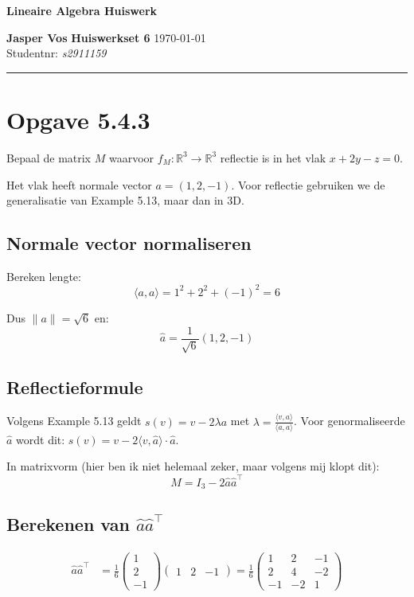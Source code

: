 \documentclass{article}
\newcommand{\R}{\mathbb{R}}
\begin{document}
{\Large \textbf{Lineaire Algebra Huiswerk}}

\bigskip

\textbf{Jasper Vos} \hfill \textbf{Huiswerkset 6} \hfill \today \\
Studentnr: \emph{s2911159}

\rule{\textwidth}{2pt}

\bigskip

\section*{Opgave 5.4.3}

Bepaal de matrix $M$ waarvoor $f_M: \R^3 \to \R^3$ reflectie is in het vlak $x + 2y - z = 0$.

Het vlak heeft normale vector $a = (1, 2, -1)$. Voor reflectie gebruiken we de generalisatie
van Example 5.13, maar dan in 3D.

\subsection*{Normale vector normaliseren}

Bereken lengte:
\[ \langle a, a \rangle = 1^2 + 2^2 + (-1)^2 = 6 \]

Dus $\|a\| = \sqrt{6}$ en:
\[ \hat{a} = \frac{1}{\sqrt{6}}(1, 2, -1) \]

\subsection*{Reflectieformule}

Volgens Example 5.13 geldt $s(v) = v - 2\lambda a$ met $\lambda = \frac{\langle v, a \rangle}{\langle a, a \rangle}$.
Voor genormaliseerde $\hat{a}$ wordt dit: $s(v) = v - 2\langle v, \hat{a} \rangle \cdot \hat{a}$.

In matrixvorm (hier ben ik niet helemaal zeker, maar volgens mij klopt dit):
\[ M = I_3 - 2\hat{a}\hat{a}^{\top} \]

\subsection*{Berekenen van $\hat{a}\hat{a}^{\top}$}

\begin{align*}
    \hat{a}\hat{a}^{\top} & = \frac{1}{6} \begin{pmatrix} 1 \\ 2 \\ -1 \end{pmatrix}
    \begin{pmatrix} 1 & 2 & -1 \end{pmatrix}
    = \frac{1}{6} \begin{pmatrix}
                      1  & 2  & -1 \\
                      2  & 4  & -2 \\
                      -1 & -2 & 1
                  \end{pmatrix}
\end{align*}
\end{document}
